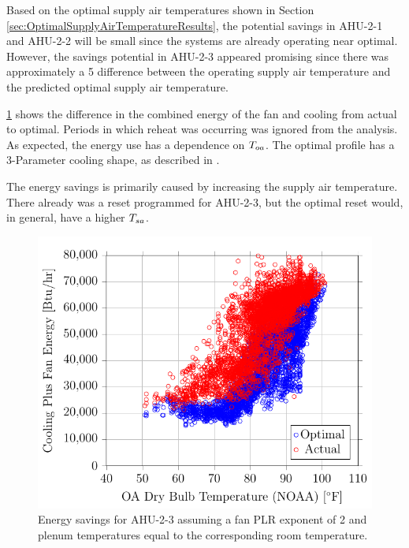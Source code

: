 Based on the optimal supply air temperatures shown in Section
\ref{sec:OptimalSupplyAirTemperatureResults}, the potential savings in
AHU-2-1 and AHU-2-2 will be small since the systems are already
operating near optimal. However, the savings potential in AHU-2-3
appeared promising since there was approximately a \SI{5}{\degreeF}
difference between the operating supply air temperature and the
predicted optimal supply air temperature. 

\figref{}
\ref{fig:2017-01-24-1607-VariableTotalPowervsOADryBulbTemperatureNOAA}
shows the difference in the combined energy of the fan and cooling from
actual to optimal. Periods in which reheat was occurring was ignored
from the analysis. As expected, the energy use has a dependence on
\(T_{oa}\). The optimal profile has a 3-Parameter cooling shape, as
described in \cite{ASHRAE2014}. 

The energy savings is primarily caused by increasing the supply air
temperature. There already was a reset programmed for AHU-2-3, but the
optimal reset would, in general, have a higher \(T_{sa}\). 


\begin{figure}
\centering
\includegraphics[]{Plots/2017-01-24-1607-VariableTotalPowervsOADryBulbTemperatureNOAA.pdf}
\caption{Energy savings for AHU-2-3 assuming a fan PLR exponent of 2 and plenum temperatures equal to the corresponding room temperature.}
\label{fig:2017-01-24-1607-VariableTotalPowervsOADryBulbTemperatureNOAA}
\end{figure}

